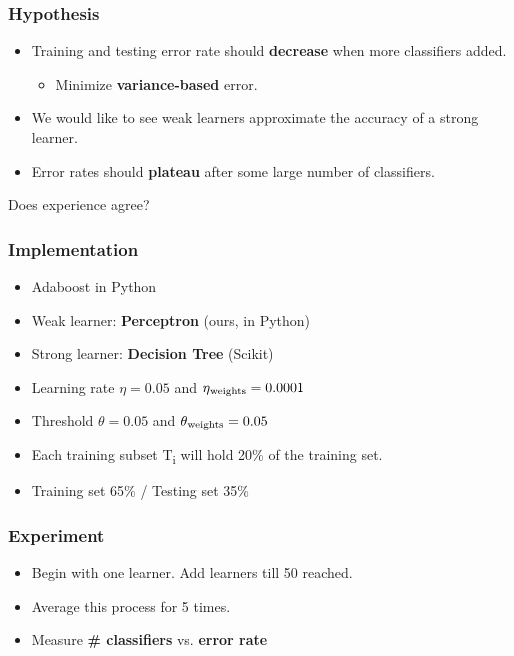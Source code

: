 \documentclass{beamer}
\begin{document}
\begin{frame}
\frametitle{Hypothesis}
\begin{itemize}
\item Training and testing error rate should \textbf{decrease} when more classifiers added. 
\begin{itemize}
\item Minimize \textbf{variance-based} error. 
\end{itemize}
\item We would like to see weak learners approximate the accuracy of a strong learner.
\item Error rates should \textbf{plateau} after some large number of classifiers.
\end{itemize}
\end{frame}
\begin{frame}
\Huge{\centerline{Does experience agree?}}
\end{frame}
\begin{frame}
\frametitle{Implementation}
\begin{itemize}
\item Adaboost in Python
\item Weak learner: \textbf{Perceptron} (ours, in Python)
\item Strong learner: \textbf{Decision Tree} (Scikit)
\item Learning rate $\eta = 0.05$ and $\eta\textsubscript{weights} = 0.0001$ 
\item Threshold $\theta = 0.05$ and $\theta\textsubscript{weights} = 0.05$
\item Each training subset T\textsubscript{i} will hold 20\% of the training set.
\item Training set 65\% / Testing set 35\%
\end{itemize}
\end{frame}
\begin{frame}
\frametitle{Experiment}
\begin{itemize}
\item Begin with one learner. Add learners till 50 reached. 
\item Average this process for 5 times.  
\item Measure \textbf{\# classifiers} vs. \textbf{error rate} 
\end{itemize}
\end{frame}
\end{document}
